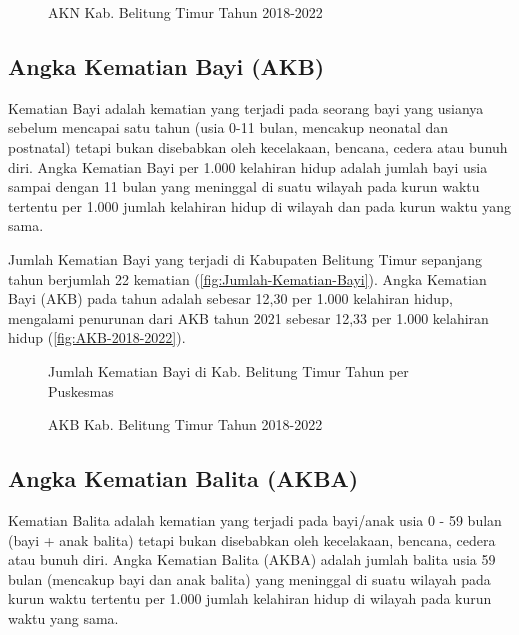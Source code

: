 \begin{figure}[H]
    \centering{}
    \caption{AKN Kab. Belitung Timur Tahun 2018-2022}
    \label{fig:AKN-2018-2022}
\end{figure}


\subsection{Angka Kematian Bayi (AKB)}
Kematian Bayi adalah kematian yang terjadi pada seorang bayi yang usianya sebelum mencapai satu tahun (usia 0-11 bulan, mencakup neonatal dan postnatal) tetapi bukan disebabkan oleh kecelakaan, bencana, cedera atau bunuh diri. Angka Kematian Bayi per 1.000 kelahiran hidup adalah jumlah bayi usia sampai dengan 11 bulan yang meninggal di suatu wilayah pada kurun waktu tertentu per 1.000 jumlah kelahiran hidup di wilayah dan pada kurun waktu yang sama.

Jumlah Kematian Bayi yang terjadi di Kabupaten Belitung Timur sepanjang tahun \tP berjumlah 22 kematian (\autoref{fig:Jumlah-Kematian-Bayi}). Angka Kematian Bayi (AKB) pada tahun \tP adalah sebesar 12,30 per 1.000 kelahiran hidup, mengalami penurunan dari AKB tahun 2021 sebesar 12,33 per 1.000 kelahiran hidup (\autoref{fig:AKB-2018-2022}).

\begin{figure}[H]
    \centering{}
    \caption{Jumlah Kematian Bayi di Kab. Belitung Timur Tahun \tP per Puskesmas}
    \label{fig:Jumlah-Kematian-Bayi}
\end{figure}

\begin{figure}[H]
    \centering{}
    \caption{AKB Kab. Belitung Timur Tahun 2018-2022}
    \label{fig:AKB-2018-2022}
\end{figure}


\subsection{Angka Kematian Balita (AKBA)}
Kematian Balita adalah kematian yang terjadi pada bayi/anak usia 0 - 59 bulan (bayi + anak balita) tetapi bukan disebabkan oleh kecelakaan, bencana, cedera atau bunuh diri. Angka Kematian Balita (AKBA) adalah jumlah balita usia 59 bulan (mencakup bayi dan anak balita) yang meninggal di suatu wilayah pada kurun waktu tertentu
per 1.000 jumlah kelahiran hidup di wilayah pada kurun waktu yang sama.

